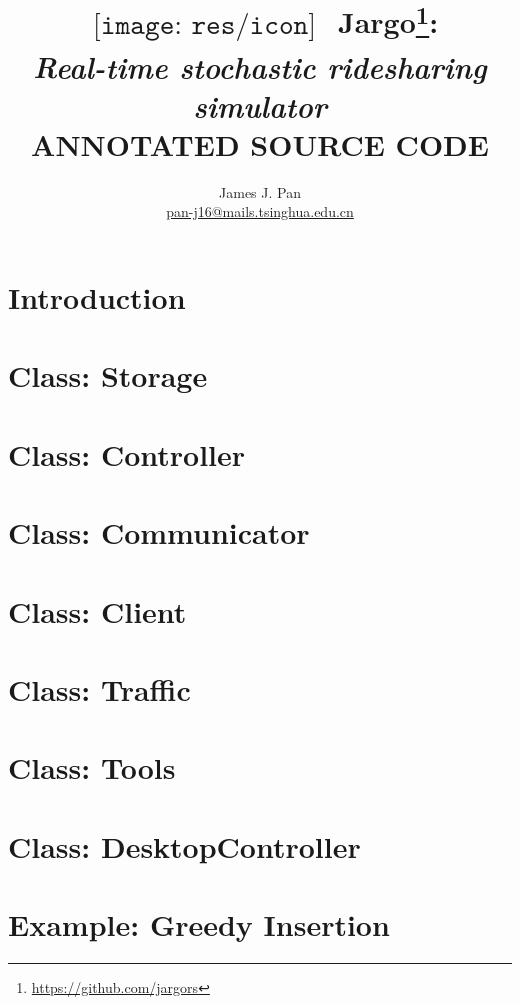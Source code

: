 \documentclass{report}
\title{
$
\begin{array}{l}
\texttt{[image: res/icon]}
\end{array}
$
Jargo\footnote{\url{https://github.com/jargors}}:\\
\large{\textbf{\textit{Real-time stochastic ridesharing simulator}}\\
\vspace{2em}
\small{\textsc{ANNOTATED SOURCE CODE}}}
}
\author{James J. Pan\\
  \small{\href{mailto:pan-j16@mails.tsinghua.edu.cn}{pan-j16@mails.tsinghua.edu.cn}}}
\theoremstyle{definition}                   %
\begin{document}
\maketitle
\pagestyle{noweb}

\renewcommand{\thepage}{\roman{page}}
\setcounter{page}{1}

\tableofcontents

\renewcommand{\thepage}{\arabic{page}}
\setcounter{page}{1}

\chapter{Introduction}

\chapter{Class: Storage}

\chapter{Class: Controller}

\chapter{Class: Communicator}

\chapter{Class: Client}

\chapter{Class: Traffic}

\chapter{Class: Tools}

\chapter{Class: DesktopController}

\chapter{Example: Greedy Insertion}
\end{document}
